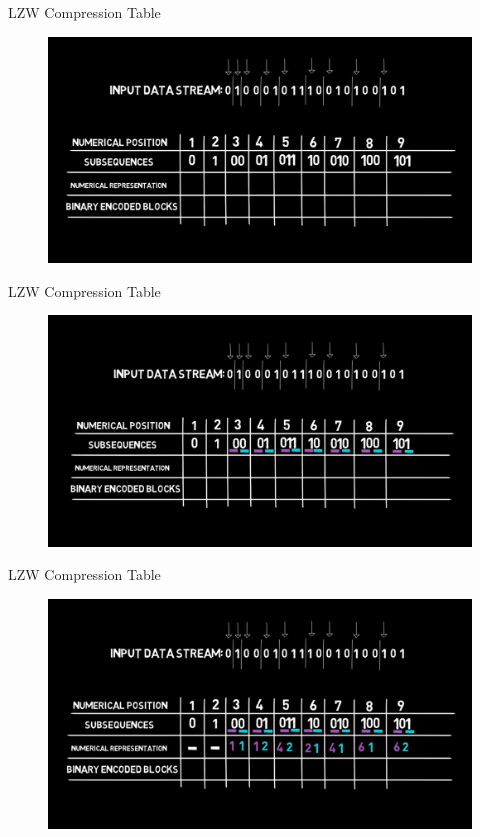 \documentclass{beamer}
\begin{document}
\begin{frame}[fragile]{LZW Compression Table}
\begin{figure}
\centering
\includegraphics[width=\textwidth]{assets/7.png}
\end{figure}
\end{frame}
\begin{frame}[fragile]{LZW Compression Table}
\begin{figure}
\centering
\includegraphics[width=\textwidth]{assets/8.png}
\end{figure}
\end{frame}
\begin{frame}[fragile]{LZW Compression Table}
\begin{figure}
\centering
\includegraphics[width=\textwidth]{assets/9.png}
\end{figure}
\end{frame}
\end{document}
